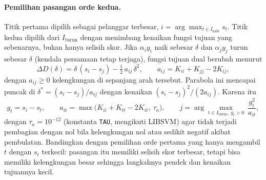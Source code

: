 \paragraph{Pemilihan pasangan orde kedua.} Titik pertama dipilih sebagai pelanggar terbesar, $i = \arg\max_{t \in I_{\text{naik}}} s_t$. Titik kedua dipilih dari $I_{\text{turun}}$ dengan menimbang kenaikan fungsi tujuan yang sebenarnya, bukan hanya selisih skor. Jika $\alpha_i y_i$ naik sebesar $\delta$ dan $\alpha_j y_j$ turun sebesar $\delta$ (kendala persamaan tetap terjaga), fungsi tujuan dual berubah menurut
\begin{equation}
	\Delta D(\delta) = \delta\,(s_i - s_j) - \tfrac{1}{2}\,a_{ij}\,\delta^2, \qquad a_{ij} = K_{ii} + K_{jj} - 2K_{ij},
\end{equation}
dengan $a_{ij} \ge 0$ kelengkungan di sepanjang arah tersebut. Parabola ini mencapai puncak di $\delta^{*} = (s_i - s_j)/a_{ij}$ dengan kenaikan $(s_i - s_j)^2 / (2a_{ij})$. Karena itu
\begin{equation}
	g_t = s_i - s_t, \qquad a_{it} = \max\big(K_{ii} + K_{tt} - 2K_{it},\ \tau_a\big), \qquad
	j = \arg\max_{t \in I_{\text{turun}},\ g_t > 0}\ \frac{g_t^{2}}{a_{it}},
	\label{eq:svm-pasangan}
\end{equation}
dengan $\tau_a = 10^{-12}$ (konstanta \texttt{TAU}, mengikuti LIBSVM) agar tidak terjadi pembagian dengan nol bila kelengkungan nol atau sedikit negatif akibat pembulatan. Bandingkan dengan pemilihan orde pertama yang hanya mengambil $t$ dengan $s_t$ terkecil: pasangan itu memiliki selisih skor terbesar, tetapi bisa memiliki kelengkungan besar sehingga langkahnya pendek dan kenaikan tujuannya kecil.

